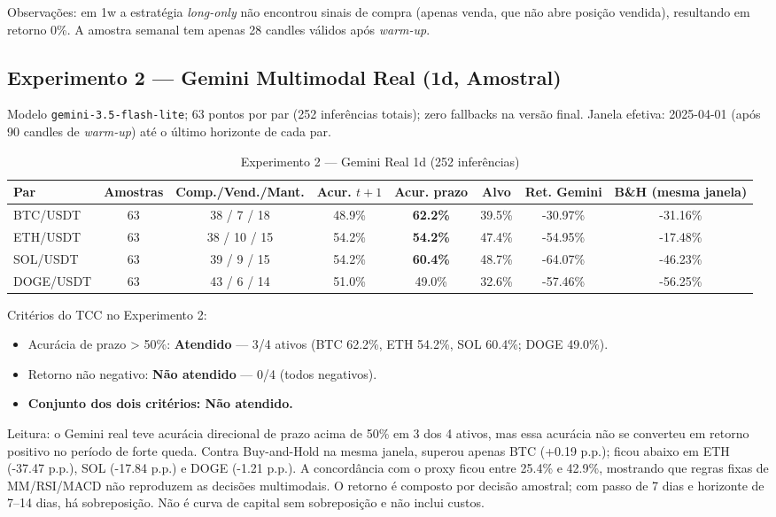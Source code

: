 \documentclass[conference]{IEEEtran}
\begin{document}
Observações: em 1w a estratégia \textit{long-only} não encontrou sinais de compra (apenas venda, que não abre posição vendida), resultando em retorno 0\%. A amostra semanal tem apenas 28 candles válidos após \textit{warm-up}.

\subsection{Experimento 2 — Gemini Multimodal Real (1d, Amostral)}

Modelo \texttt{gemini-3.5-flash-lite}; 63 pontos por par (252 inferências totais); zero fallbacks na versão final. Janela efetiva: 2025-04-01 (após 90 candles de \textit{warm-up}) até o último horizonte de cada par.

\begin{table}[t]
  \centering
  \caption{Experimento 2 — Gemini Real 1d (252 inferências)}
  \label{tab:exp2_gemini}
  \small
  \begin{tabular}{lccccccc}
    \toprule
    Par & Amostras & Comp./Vend./Mant. & Acur. $t+1$ & Acur. prazo & Alvo & Ret. Gemini & B\&H (mesma janela) \\
    \midrule
    BTC/USDT & 63 & 38 / 7 / 18 & 48.9\% & \textbf{62.2\%} & 39.5\% & -30.97\% & -31.16\% \\
    ETH/USDT & 63 & 38 / 10 / 15 & 54.2\% & \textbf{54.2\%} & 47.4\% & -54.95\% & -17.48\% \\
    SOL/USDT & 63 & 39 / 9 / 15 & 54.2\% & \textbf{60.4\%} & 48.7\% & -64.07\% & -46.23\% \\
    DOGE/USDT& 63 & 43 / 6 / 14 & 51.0\% & 49.0\% & 32.6\% & -57.46\% & -56.25\% \\
    \bottomrule
  \end{tabular}
\end{table}

Critérios do TCC no Experimento 2:

\begin{itemize}
  \item Acurácia de prazo > 50\%: \textbf{Atendido} — 3/4 ativos (BTC 62.2\%, ETH 54.2\%, SOL 60.4\%; DOGE 49.0\%).
  \item Retorno não negativo: \textbf{Não atendido} — 0/4 (todos negativos).
  \item \textbf{Conjunto dos dois critérios: Não atendido.}
\end{itemize}

Leitura: o Gemini real teve acurácia direcional de prazo acima de 50\% em 3 dos 4 ativos, mas essa acurácia não se converteu em retorno positivo no período de forte queda. Contra Buy-and-Hold na mesma janela, superou apenas BTC (+0.19 p.p.); ficou abaixo em ETH (-37.47 p.p.), SOL (-17.84 p.p.) e DOGE (-1.21 p.p.). A concordância com o proxy ficou entre 25.4\% e 42.9\%, mostrando que regras fixas de MM/RSI/MACD não reproduzem as decisões multimodais. O retorno é composto por decisão amostral; com passo de 7 dias e horizonte de 7–14 dias, há sobreposição. Não é curva de capital sem sobreposição e não inclui custos.
\end{document}
